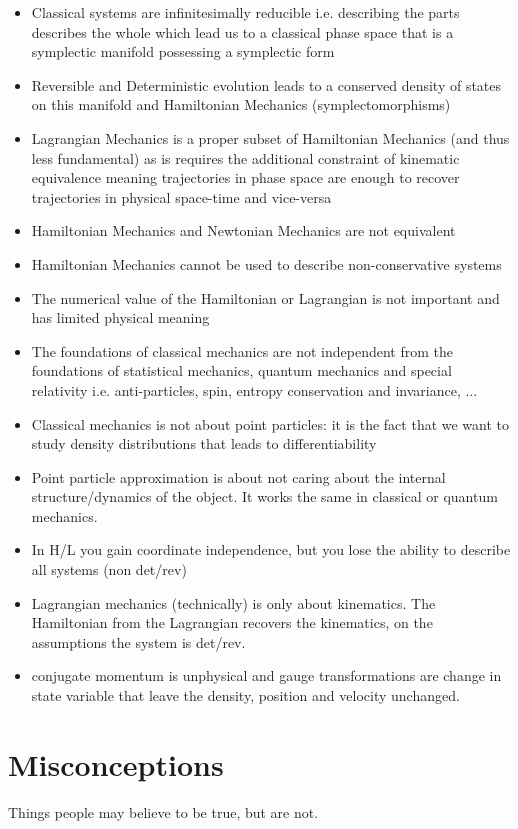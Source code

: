 \documentclass{article}
\begin{document}
\begin{itemize}
	\item Classical systems are infinitesimally reducible i.e. describing the parts describes the whole which lead us to a classical phase space that is a symplectic manifold possessing a symplectic form
	\item Reversible and Deterministic evolution leads to a conserved density of states on this manifold and Hamiltonian Mechanics (symplectomorphisms) 
	\item Lagrangian Mechanics is a proper subset of Hamiltonian Mechanics (and thus less fundamental) as is requires the additional constraint of kinematic equivalence meaning trajectories in phase space are enough to recover trajectories in physical space-time and vice-versa
	\item Hamiltonian Mechanics and Newtonian Mechanics are not equivalent
	\item Hamiltonian Mechanics cannot be used to describe non-conservative systems
	\item The numerical value of the Hamiltonian or Lagrangian is not important and has limited physical meaning
	\item The foundations of classical mechanics are not independent from the foundations of statistical mechanics, quantum mechanics and special relativity i.e. anti-particles, spin, entropy conservation and invariance, ...
	\item Classical mechanics is not about point particles: it is the fact that we want to study density distributions that leads to differentiability
	\item Point particle approximation is about not caring about the internal structure/dynamics of the object. It works the same in classical or quantum mechanics.
	\item In H/L you gain coordinate independence, but you lose the ability to describe all systems (non det/rev)
	\item Lagrangian mechanics (technically) is only about kinematics. The Hamiltonian from the Lagrangian recovers the kinematics, on the assumptions the system is det/rev.
	\item conjugate momentum is unphysical and gauge transformations are change in state variable that leave the density, position and velocity unchanged.
\end{itemize}


\section{Misconceptions}
Things people may believe to be true, but are not.
\end{document}
